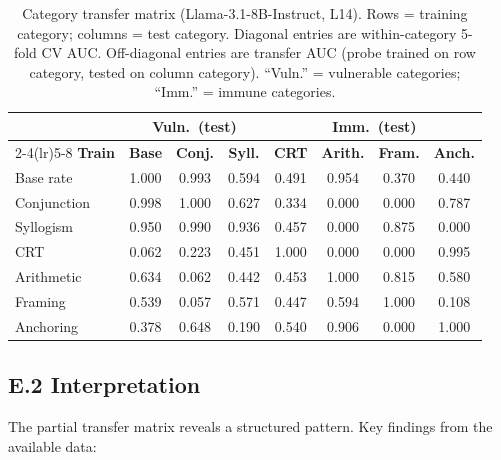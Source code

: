 \documentclass{article}
\begin{document}
\begin{table}[ht]
\centering
\caption{Category transfer matrix (Llama-3.1-8B-Instruct, L14).
  Rows = training category; columns = test category.  Diagonal
  entries are within-category 5-fold CV AUC.  Off-diagonal entries
  are transfer AUC (probe trained on row category, tested on column
  category).  ``Vuln.'' = vulnerable categories; ``Imm.'' = immune
  categories.}
\label{tab:transfer_matrix}
\vspace{4pt}
\small
\begin{tabular}{lccc|cccc}
\toprule
& \multicolumn{3}{c}{\textbf{Vuln.\ (test)}} & \multicolumn{4}{c}{\textbf{Imm.\ (test)}} \\
\cmidrule(lr){2-4}\cmidrule(lr){5-8}
\textbf{Train} & \textbf{Base} & \textbf{Conj.} & \textbf{Syll.} & \textbf{CRT} & \textbf{Arith.} & \textbf{Fram.} & \textbf{Anch.} \\
\midrule
Base rate    & 1.000 & 0.993 & 0.594 & 0.491 & 0.954 & 0.370 & 0.440 \\
Conjunction  & 0.998 & 1.000 & 0.627 & 0.334 & 0.000 & 0.000 & 0.787 \\
Syllogism    & 0.950 & 0.990 & 0.936 & 0.457 & 0.000 & 0.875 & 0.000 \\
\midrule
CRT          & 0.062 & 0.223 & 0.451 & 1.000 & 0.000 & 0.000 & 0.995 \\
Arithmetic   & 0.634 & 0.062 & 0.442 & 0.453 & 1.000 & 0.815 & 0.580 \\
Framing      & 0.539 & 0.057 & 0.571 & 0.447 & 0.594 & 1.000 & 0.108 \\
Anchoring    & 0.378 & 0.648 & 0.190 & 0.540 & 0.906 & 0.000 & 1.000 \\
\bottomrule
\end{tabular}
\end{table}

\subsection*{E.2 Interpretation}

The partial transfer matrix reveals a structured pattern.  Key
findings from the available data:
\end{document}
